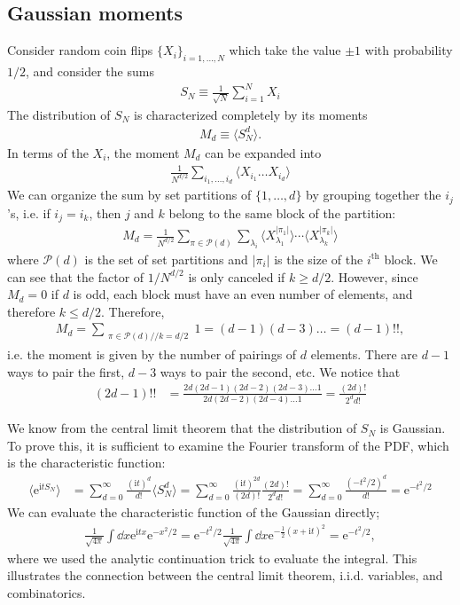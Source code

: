 \documentclass[11pt]{article}
\newcommand{\ii}{\mathrm i}
\newcommand{\e}{\mathrm e}
\theoremstyle{definition}
\begin{document}
\subsection{Gaussian moments}
Consider random coin flips $\{X_i\}_{i = 1, \ldots, N}$ which take the value $\pm 1$ with probability $1/2$, and consider the sums
\begin{align}
S_N \equiv \frac{1}{\sqrt{N}}\sum_{i = 1}^N X_i\label{eq:partial_sum}
\end{align}
The distribution of $S_N$ is characterized completely by its moments
\begin{align}
M_d \equiv \langle S_N^d\rangle.
\end{align}
In terms of the $X_i$, the moment $M_d$ can be expanded into
\begin{align}
\frac{1}{N^{d/2}}\sum_{i_1, \ldots, i_d}\langle X_{i_1} \ldots X_{i_d}\rangle
\end{align}
We can organize the sum by set partitions of $\{1, \ldots, d\}$ by grouping together the $i_j$'s, i.e. if $i_j = i_k$, then $j$ and $k$ belong to the same block of the partition:
\begin{align}
M_d = \frac{1}{N^{d/2}}\sum_{\pi \in \mathcal P(d)}\sum_{\lambda_i}\langle X_{\lambda_1}^{|\pi_1|} \rangle \cdots \langle X_{\lambda_k}^{|\pi_k|}\rangle
\end{align}
where $\mathcal P(d)$ is the set of set partitions and $|\pi_i|$ is the size of the $i^{\text{th}}$ block. We can see that the factor of $1/N^{d/2}$ is only canceled if $k \geq d/2$. However, since $M_d = 0$ if $d$ is odd, each block must have an even number of elements, and therefore $k \leq d/2$. Therefore,
\begin{align}
M_d = \sum_{\substack{\pi \in \mathcal P(d) // k = d/2}}1 = (d-1)(d-3) \ldots = (d-1)!!,
\end{align}
i.e. the moment is given by the number of pairings of $d$ elements. There are $d-1$ ways to pair the first, $d-3$ ways to pair the second, etc. We notice that
\begin{align}
(2d-1)!! &= \frac{2d(2d-1)(2d-2)(2d-3)\ldots 1}{2d(2d-2)(2d-4)\ldots 1} = \frac{(2d)!}{2^d d!}
\end{align}

We know from the central limit theorem that the distribution of $S_N$ is Gaussian. To prove this, it is sufficient to examine the Fourier transform of the PDF, which is the characteristic function:
\begin{align}
\langle \e^{\ii t S_N} \rangle &= \sum_{d  =0}^\infty \frac{(\ii t)^{d}}{d!}\langle S_N^d\rangle =\sum_{d  =0}^\infty \frac{(\ii t)^{2d}}{(2d)!}\frac{(2d)!}{2^dd!} = \sum_{d = 0}^\infty \frac{(-t^2/2)^d}{d!} = \e^{-t^2/2}
\end{align}
We can evaluate the characteristic function of the Gaussian directly;
\begin{align}
\frac{1}{\sqrt{4\pi}}\int \dd x\e^{\ii tx}\e^{-x^2/2} = \e^{-t^2/2}\frac{1}{\sqrt{4\pi}}\int \dd x \e^{-\frac{1}{2}(x + \ii t)^2} = \e^{-t^2/2},
\end{align}
where we used the analytic continuation trick to evaluate the integral. This illustrates the connection between the central limit theorem, i.i.d. variables, and combinatorics.
\end{document}
